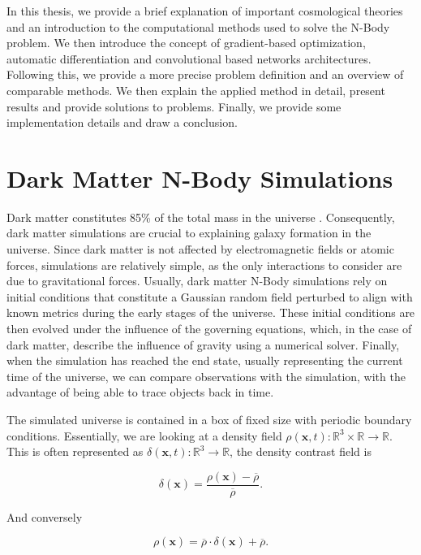 \documentclass{article}
\begin{document}
In this thesis, we provide a brief explanation of important cosmological theories and an introduction to the computational methods used to solve the N-Body problem. We then introduce the concept of gradient-based optimization, automatic differentiation and convolutional based networks architectures. Following this, we provide a more precise problem definition and an overview of comparable methods. We then explain the applied method in detail, present results and provide solutions to problems. Finally, we provide some implementation details and draw a conclusion.

\newpage


\section{Dark Matter N-Body Simulations}
Dark matter constitutes 85\% of the total mass in the universe \citep{carroll2007dark}. Consequently, dark matter simulations are crucial to explaining galaxy formation in the universe. Since dark matter is not affected by electromagnetic fields or atomic forces, simulations are relatively simple, as the only interactions to consider are due to gravitational forces. Usually, dark matter N-Body simulations rely on initial conditions that constitute a Gaussian random field perturbed to align with known metrics during the early stages of the universe. These initial conditions are then evolved under the influence of the governing equations, which, in the case of dark matter, describe the influence of gravity using a numerical solver. Finally, when the simulation has reached the end state, usually representing the current time of the universe, we can compare observations with the simulation, with the advantage of being able to trace objects back in time.

The simulated universe is contained in a box of fixed size with periodic boundary conditions. Essentially, we are looking at a density field \(\rho(\mathbf{x}, t) \colon \mathbb{R}^3 \times \mathbb{R} \rightarrow \mathbb{R}\). This is often represented as \(\delta(\mathbf{x}, t) \colon \mathbb{R}^3 \rightarrow \mathbb{R}\), the density contrast field is

\begin{equation}
    \delta(\mathbf{x}) = \frac{\rho(\mathbf{x}) - \overline{\rho}}{\overline{\rho}}.
\end{equation}

And conversely

\begin{equation}
    \rho(\mathbf{x}) = \overline{\rho} \cdot \delta(\mathbf{x}) + \overline{\rho}.
\end{equation}
\end{document}

